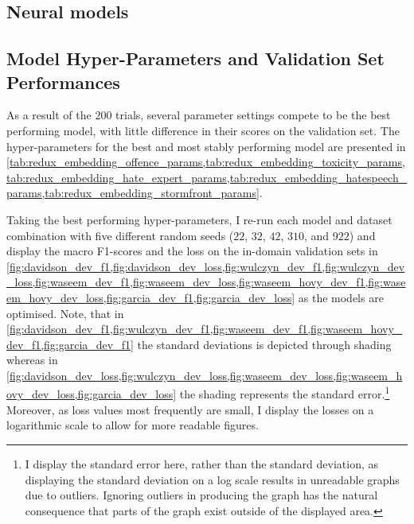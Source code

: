 \subsection{Neural models}
\subsection{Model Hyper-Parameters and Validation Set Performances}
As a result of the $200$ trials, several parameter settings compete to be the best performing model, with little difference in their scores on the validation set.
The hyper-parameters for the best and most stably performing model are presented in \cref{tab:redux_embedding_offence_params,tab:redux_embedding_toxicity_params,tab:redux_embedding_hate_expert_params,tab:redux_embedding_hatespeech_params,tab:redux_embedding_stormfront_params}.

Taking the best performing hyper-parameters, I re-run each model and dataset combination with five different random seeds ($22$, $32$, $42$, $310$, and $922$) and display the macro F1-scores and the loss on the in-domain validation sets in \cref{fig:davidson_dev_f1,fig:davidson_dev_loss,fig:wulczyn_dev_f1,fig:wulczyn_dev_loss,fig:waseem_dev_f1,fig:waseem_dev_loss,fig:waseem_hovy_dev_f1,fig:waseem_hovy_dev_loss,fig:garcia_dev_f1,fig:garcia_dev_loss} as the models are optimised.
Note, that in \cref{fig:davidson_dev_f1,fig:wulczyn_dev_f1,fig:waseem_dev_f1,fig:waseem_hovy_dev_f1,fig:garcia_dev_f1} the standard deviations is depicted through shading whereas in \cref{fig:davidson_dev_loss,fig:wulczyn_dev_loss,fig:waseem_dev_loss,fig:waseem_hovy_dev_loss,fig:garcia_dev_loss} the shading represents the standard error.\footnote{I display the standard error here, rather than the standard deviation, as displaying the standard deviation on a log scale results in unreadable graphs due to outliers. Ignoring outliers in producing the graph has the natural consequence that parts of the graph exist outside of the displayed area.}
Moreover, as loss values most frequently are small, I display the losses on a  logarithmic scale to allow for more readable figures.


